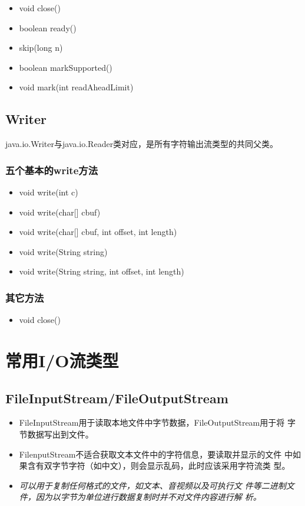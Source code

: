 \begin{itemize}
\item void close()
\item boolean ready()
\item skip(long n)
\item boolean markSupported()
\item void mark(int readAheadLimit)
\end{itemize}

\subsection{Writer}

java.io.Writer与java.io.Reader类对应，是所有字符输出流类型的共同父类。

\subsubsection{五个基本的write方法}

\begin{itemize}
\item void write(int c)
\item void write(char[] cbuf)
\item void write(char[] cbuf, int offset, int length)
\item void write(String string)
\item void write(String string, int offset, int length)
\end{itemize}

\subsubsection{其它方法}

\begin{itemize}
\item void close()
\end{itemize}

\section{常用I/O流类型}

\subsection{FileInputStream/FileOutputStream}

\begin{itemize}
\item FileInputStream用于读取本地文件中字节数据，FileOutputStream用于将
  字节数据写出到文件。
\item FilenputStream不适合获取文本文件中的字符信息，要读取并显示的文件
  中如果含有双字节字符（如中文），则会显示乱码，此时应该采用字符流类
  型。
\item {\Red \it 可以用于复制任何格式的文件，如文本、音视频以及可执行文
    件等二进制文件，因为以字节为单位进行数据复制时并不对文件内容进行解
    析。}
\end{itemize}

